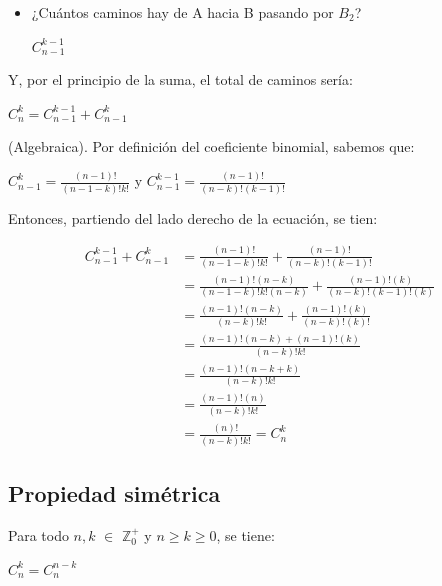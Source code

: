 \documentclass[12pt]{article}
\begin{document}
\begin{demostracion}
\begin{itemize}
        \item ¿Cuántos caminos hay de A hacia B pasando por $B_2$?

        \begin{center}
            $C^{k-1}_{n-1}$
        \end{center}
    \end{itemize}

    Y, por el principio de la suma, el total de caminos sería:

    \begin{center}
        $C^{k}_{n} = C^{k-1}_{n-1} + C^{k}_{n-1}$
    \end{center}
    
\end{demostracion}

\begin{demostracion} {(Algebraica).}
    Por definición del coeficiente binomial, sabemos que:

    \begin{center}
         $C^{k}_{n-1} = \frac{(n-1)!}{(n-1-k)!k!}$ y $C^{k-1}_{n-1} = \frac{(n-1)!}{(n-k)!(k-1)!}$
    \end{center}

    Entonces, partiendo del lado derecho de la ecuación, se tien:

    \begin{align}
        C^{k-1}_{n-1} + C^{k}_{n-1} & =\frac{(n-1)!}{(n-1-k)!k!}+\frac{(n-1)!}{(n-k)!(k-1)!} \\
        & = \frac{(n-1)!(n-k)}{(n-1-k)!k!(n-k)}+\frac{(n-1)!(k)}{(n-k)!(k-1)!(k)} \\
        & = \frac{(n-1)!(n-k)}{(n-k)!k!}+\frac{(n-1)!(k)}{(n-k)!(k)!} \\
        & = \frac{(n-1)!(n-k)+(n-1)!(k)}{(n-k)!k!} \\
        & = \frac{(n-1)!(n-k+k)}{(n-k)!k!} \\
        & = \frac{(n-1)!(n)}{(n-k)!k!} \\
        & = \frac{(n)!}{(n-k)!k!} = C^{k}_{n}
    \end{align}
    
\end{demostracion}

\subsection{Propiedad simétrica}

\begin{teorema}

    Para todo $n, k$ $\in$ $\mathbb{Z}^{+}_{0}$ y $n \geq k \geq 0$, se tiene:

    \begin{center}
        $C^{k}_{n} = C^{n-k}_{n}$
    \end{center}
\end{teorema}
\end{document}
